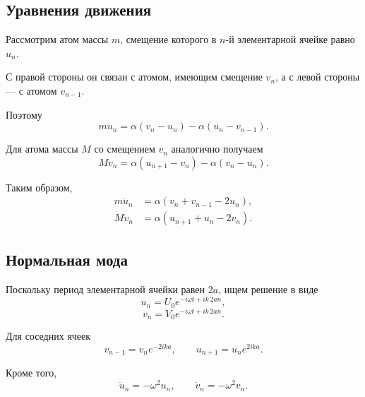 \documentclass[../final.tex]{subfiles}
\begin{document}
\solution

\subsection*{Уравнения движения}

Рассмотрим атом массы $m$,
смещение которого в $n$-й элементарной ячейке равно $u_n$.

С правой стороны он связан с атомом,
имеющим смещение $v_n$,
а с левой стороны --- с атомом $v_{n-1}$.

Поэтому
%
\begin{equation*}
    m\ddot u_n
    =
    \alpha(v_n-u_n)
    -
    \alpha(u_n-v_{n-1}).
\end{equation*}
%

Для атома массы $M$ со смещением $v_n$
аналогично получаем
%
\begin{equation*}
    M\ddot v_n
    =
    \alpha(u_{n+1}-v_n)
    -
    \alpha(v_n-u_n).
\end{equation*}
%

Таким образом,
%
\begin{align*}
    m\ddot u_n
    &=
    \alpha
    \left(
        v_n+v_{n-1}-2u_n
    \right),
    \\
    M\ddot v_n
    &=
    \alpha
    \left(
        u_{n+1}+u_n-2v_n
    \right).
\end{align*}



\subsection*{Нормальная мода}

Поскольку период элементарной ячейки равен $2a$,
ищем решение в виде
%
\begin{equation*}
    u_n
    =
    U_0
    e^{-i\omega t+ik\,2an},
\end{equation*}
%
\begin{equation*}
    v_n
    =
    V_0
    e^{-i\omega t+ik\,2an}.
\end{equation*}
%

Для соседних ячеек
%
\begin{equation*}
    v_{n-1}
    =
    v_n e^{-2ika},
    \qquad
    u_{n+1}
    =
    u_n e^{2ika}.
\end{equation*}
%

Кроме того,
%
\begin{equation*}
    \ddot u_n=-\omega^2u_n,
    \qquad
    \ddot v_n=-\omega^2v_n.
\end{equation*}
\end{document}

